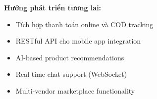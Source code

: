 \textbf{Hướng phát triển tương lai:}
\begin{itemize}
    \item Tích hợp thanh toán online và COD tracking
    \item RESTful API cho mobile app integration
    \item AI-based product recommendations
    \item Real-time chat support (WebSocket)
    \item Multi-vendor marketplace functionality
\end{itemize}
